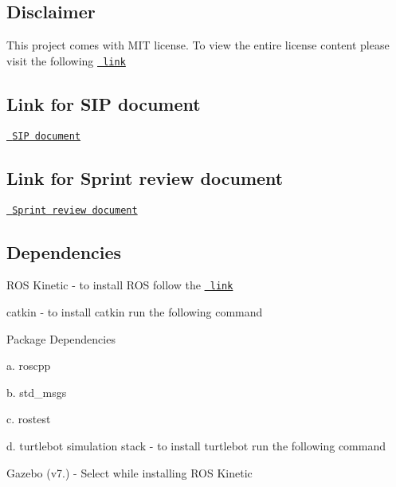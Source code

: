  \subsection*{Disclaimer}

This project comes with M\+IT license. To view the entire license content please visit the following \href{https://opensource.org/licenses/MIT}\texttt{ link}

\subsection*{Link for S\+IP document}

\href{https://docs.google.com/spreadsheets/d/10SLYF6b-H8jBe_Sn3X3n9NG67jSoSL41Iv0T1WjI9ok/edit?usp=sharing}\texttt{ S\+IP document}

\subsection*{Link for Sprint review document}

\href{https://docs.google.com/document/d/1Z08-iwbV5uTY5A9PehAq-EnedAIHFBOwVHvecpv49y0/edit?usp=sharing}\texttt{ Sprint review document}

\subsection*{Dependencies}


\begin{DoxyEnumerate}
\item R\+OS Kinetic -\/ to install R\+OS follow the \href{http://wiki.ros.org/kinetic/Installation}\texttt{ link}
\item catkin -\/ to install catkin run the following command 
\begin{DoxyCode}{0}
\end{DoxyCode}

\item Package Dependencies

a. roscpp

b. std\+\_\+msgs

c. rostest

d. turtlebot simulation stack -\/ to install turtlebot run the following command 
\begin{DoxyCode}{0}
\end{DoxyCode}

\begin{DoxyEnumerate}
\item Gazebo (v7.) -\/ Select while installing R\+OS Kinetic
\end{DoxyEnumerate}
\end{DoxyEnumerate}

